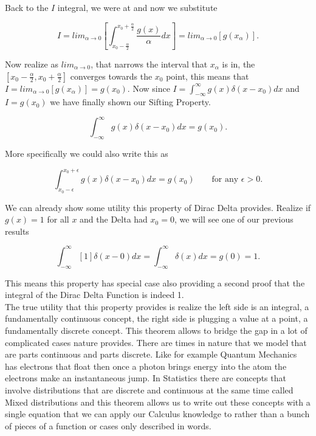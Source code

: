\documentclass[12pt]{article}
\begin{document}
Back to the $I$ integral, we were at and now we substitute

\begin{equation*}
    I = lim_{\alpha\rightarrow0} \left[\int_{x_0-\frac{\alpha}{2}}^{x_0+\frac{\alpha}{2}} \frac{g(x)}{\alpha} dx\right] = lim_{\alpha\rightarrow0} [g(x_{\alpha})].
\end{equation*}

Now realize as $lim_{\alpha\rightarrow0}$, that narrows the interval that $x_{\alpha}$ is in, the $[x_0-\frac{\alpha}{2},x_0+\frac{\alpha}{2}]$ converges towards the $x_0$ point, this means that $I=lim_{\alpha\rightarrow0} [g(x_{\alpha})]=g(x_0)$. Now since $I=\int_{-\infty}^{\infty} g(x)\delta(x-x_0) dx$ and $I=g(x_0)$ we have finally shown our Sifting Property.

\begin{equation*}
    \int_{-\infty}^{\infty} g(x)\delta(x-x_0) dx = g(x_0).
\end{equation*}

More specifically we could also write this as

\begin{equation*}
    \int_{x_0-\epsilon}^{x_0+\epsilon} g(x)\delta(x-x_0) dx = g(x_0) \qquad \text{for any } \epsilon>0.
\end{equation*}

We can already show some utility this property of Dirac Delta provides. Realize if $g(x)=1$ for all $x$ and the Delta had $x_0=0$, we will see one of our previous results

\begin{equation*}
    \int_{-\infty}^{\infty} [1]\delta(x-0) dx = \int_{-\infty}^{\infty} \delta(x) dx = g(0) = 1.
\end{equation*}

This means this property has special case also providing a second proof that the integral of the Dirac Delta Function is indeed 1. \\

The true utility that this property provides is realize the left side is an integral, a fundamentally continuous concept, the right side is plugging a value at a point, a fundamentally discrete concept. This theorem allows to bridge the gap in a lot of complicated cases nature provides. There are times in nature that we model that are parts continuous and parts discrete. Like for example Quantum Mechanics has electrons that float then once a photon brings energy into the atom the electrons make an instantaneous jump. In Statistics there are concepts that involve distributions that are discrete and continuous at the same time called Mixed distributions and this theorem allows us to write out these concepts with a single equation that we can apply our  Calculus knowledge to rather than a bunch of pieces of a function or cases only described in words.
\end{document}
